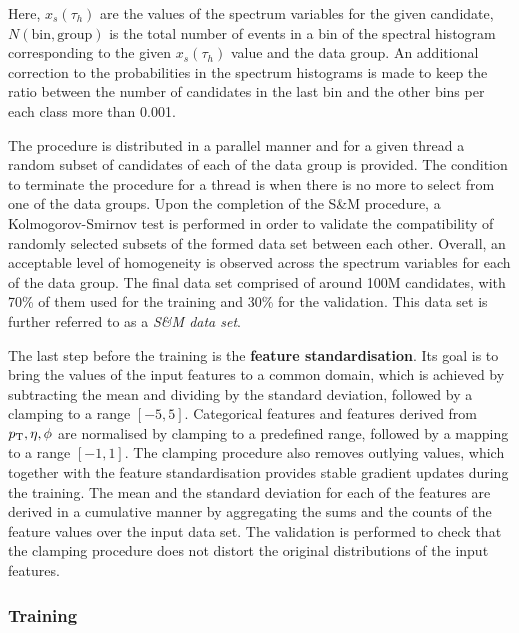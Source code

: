 Here, $x_s(\tau_h)$ are the values of the spectrum variables for the given \tauh candidate, $N(\text{bin},\text{group})$ is the total number of events in a bin of the spectral histogram corresponding to the given $x_s(\tau_h)$ value and the data group. An additional correction to the probabilities in the spectrum histograms is made to keep the ratio between the number of \tauh candidates in the last \pt bin and the other \pt bins per each class more than 0.001. 

The procedure is distributed in a parallel manner and for a given thread a random subset of \tauh candidates of each of the data group is provided. The condition to terminate the procedure for a thread is when there is no more \tauh to select from one of the data groups. Upon the completion of the S\&M procedure, a Kolmogorov-Smirnov test is performed in order to validate the compatibility of randomly selected subsets of the formed data set between each other. Overall, an acceptable level of homogeneity is observed across the spectrum variables for each of the data group. The final data set comprised of around 100M \tauh candidates, with 70\% of them used for the training and 30\% for the validation. This data set is further referred to as a \textit{S\&M data set}.  

The last step before the training is the \textbf{feature standardisation}. Its goal is to bring the values of the input features to a common domain, which is achieved by subtracting the mean and dividing by the standard deviation, followed by a clamping to a range $[-5,5]$. Categorical features and features derived from $p_{\text{T}}, \eta, \phi$ are normalised by clamping to a predefined range, followed by a mapping to a range $[-1,1]$. The clamping procedure also removes outlying values, which together with the feature standardisation provides stable gradient updates during the training. The mean and the standard deviation for each of the features are derived in a cumulative manner by aggregating the sums and the counts of the feature values over the input data set. The validation is performed to check that the clamping procedure does not distort the original distributions of the input features.

\subsubsection{Training}

